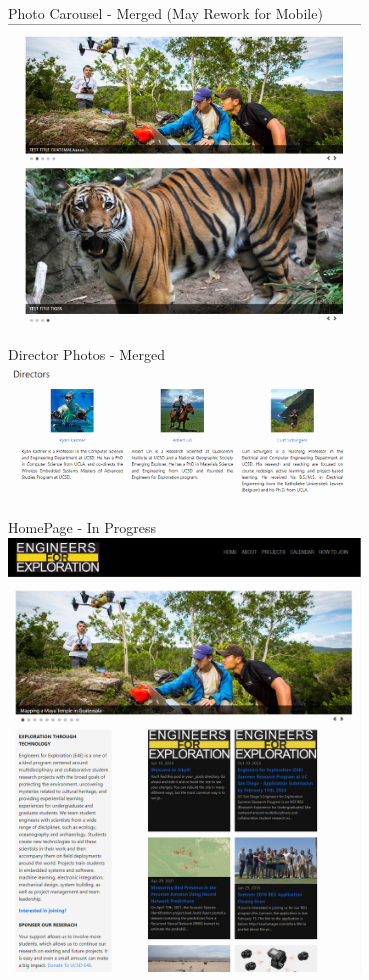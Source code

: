 \begin{frame}{Photo Carousel - Merged (May Rework for Mobile)}
    \centering
    \includegraphics[height=0.7\textheight,width=0.7\textwidth,keepaspectratio]{./images/Screenshot 2024-04-29 123620.png}
\end{frame}
\begin{frame}{Director Photos - Merged}
    \centering
    \includegraphics[height=0.7\textheight,width=0.7\textwidth,keepaspectratio]{./images/326290539-4b1b66e6-6d6f-4a5c-b453-96dc81ab773b.png}
\end{frame}
\begin{frame}{HomePage - In Progress}
    \centering
    \includegraphics[height=0.7\textheight,width=0.7\textwidth,keepaspectratio]{./images/Screenshot 2024-05-06 102507.png}
\end{frame}
